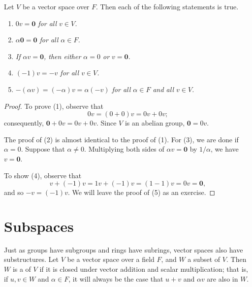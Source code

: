  
\begin{proposition}
Let $V$ be a vector space over $F$. Then each of the following
statements is true. 
\begin{enumerate}

\rm \item \it 
$0v ={\mathbf 0}$ for all $v \in V$.

\rm \item \it 
$\alpha {\mathbf 0} = {\mathbf 0}$ for all $\alpha \in F$.


\rm \item \it 
If $\alpha v = {\mathbf 0}$, then either $\alpha = 0$ or $v = {\mathbf
0}$.  

\rm \item \it
$(-1) v = -v$ for all $v \in V$.

\rm \item \it 
$-(\alpha v) = (-\alpha)v = \alpha(-v)$ for all $\alpha \in F$ and all
$v \in V$. 

\end{enumerate}
\end{proposition}


\begin{proof}
To prove (1), observe that 
\[
0 v = (0 + 0)v = 0v + 0v;
\]
consequently, ${\mathbf 0} + 0 v = 0v + 0v$. Since $V$ is an abelian
group, ${\mathbf 0} = 0v$. 


The proof of (2) is almost identical to the proof of (1). For (3), we
are done if $\alpha = 0$.  Suppose that $\alpha \neq 0$. Multiplying
both sides of $\alpha v = {\mathbf 0}$ by $1/ \alpha$, we have $v =
{\mathbf 0}$.


To show (4), observe that
\[
v + (-1)v = 1v + (-1)v = (1-1)v = 0v = {\mathbf 0},
\]
and so $-v = (-1)v$. We will leave the proof of (5) as an exercise.
\end{proof}
 
 
 
\section{Subspaces}


Just as groups have subgroups and rings have subrings, vector spaces
also have substructures. Let $V$ be a vector space over a field $F$,
and $W$ a subset of $V$. Then $W$ is a  of $V$ if it is closed under vector addition and
scalar multiplication; that is, if $u, v \in W$ and $\alpha
\in F$, it will always be the case that $u+v$ and $\alpha v$ are also
in $W$.   
 

